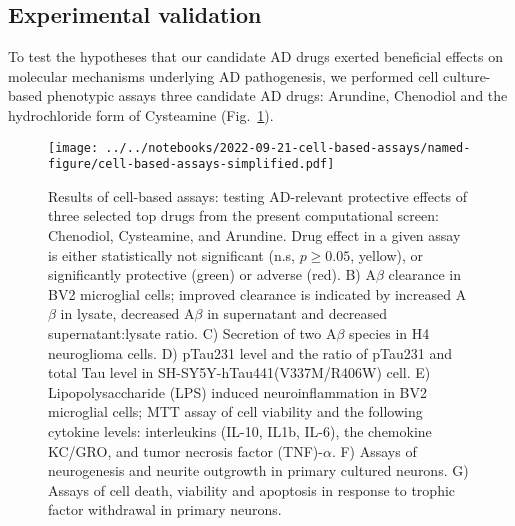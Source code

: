 \documentclass[letterpaper]{article}
\begin{document}
\subsection{Experimental validation}

To test the hypotheses that our candidate AD drugs exerted beneficial effects
on molecular mechanisms underlying AD pathogenesis, we performed cell
culture-based phenotypic assays  three candidate AD drugs: Arundine, Chenodiol
and the hydrochloride form of Cysteamine (Fig.~\ref{fig:cell-based-assays}).

\begin{figure}
\texttt{[image: ../../notebooks/2022-09-21-cell-based-assays/named-figure/cell-based-assays-simplified.pdf]}
\caption{Results of cell-based assays: testing AD-relevant protective effects of three
  selected top drugs from the present computational screen: Chenodiol,
  Cysteamine, and Arundine.
  Drug effect in a given assay is either statistically not significant (n.s,
  $p \ge 0.05$, yellow), or significantly protective (green) or adverse (red).
  B) A$\beta$ clearance in BV2 microglial cells; improved clearance is indicated by
  increased A$\beta$ in lysate, decreased A$\beta$ in supernatant and
  decreased supernatant:lysate ratio.
  C) Secretion of two A$\beta$ species in H4 neuroglioma cells.
  D) pTau231 level and the ratio of pTau231 and total Tau level in SH-SY5Y-hTau441(V337M/R406W) cell.
  E) Lipopolysaccharide (LPS) induced neuroinflammation in BV2 microglial cells; MTT
  assay of cell viability and the following cytokine levels: interleukins
  (IL-10, IL1b, IL-6), the chemokine KC/GRO, and tumor necrosis factor
  (TNF)-$\alpha$.
  F) Assays of neurogenesis and neurite outgrowth in primary cultured neurons.
  G) Assays of cell death, viability and apoptosis in response to trophic
  factor withdrawal in primary neurons.
}
\label{fig:cell-based-assays}
\end{figure}
\end{document}
